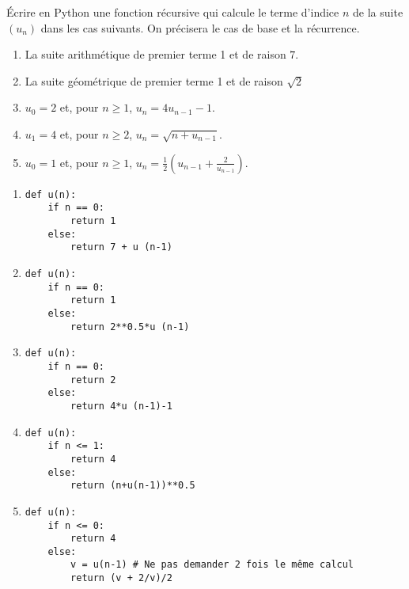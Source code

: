 \begin{Exercise}[title = {Suites}]
Écrire en Python une fonction récursive qui calcule le terme d'indice $n$ de la suite $(u_n)$ dans les cas suivants. On précisera le cas de base et la récurrence.
\begin{enumerate}
\item La suite arithmétique  de premier terme 1 et de raison $7$.

\item La suite géométrique de premier terme 1 et de raison $\sqrt{2}$

\item $u_0=2$ et, pour $n\ge  1$, $u_n=4u_{n-1}-1$.

\item $u_{1}=4$ et, pour $n\ge 2$,  $u_{n}=\sqrt{n+u_{n-1}}$.

\item $u_0=1$ et, pour $n\ge  1$, $\displaystyle u_n=\frac12 \left(u_{n-1}+\frac2{u_{n-1}}\right)$.
\end{enumerate}
\end{Exercise}
\begin{Answer}
\begin{enumerate}
\item 
\begin{lstlisting}
def u(n):
    if n == 0:
        return 1
    else:
        return 7 + u (n-1)
\end{lstlisting} 

\item  
\begin{lstlisting}
def u(n):
    if n == 0:
        return 1
    else:
        return 2**0.5*u (n-1)
\end{lstlisting}

\item 
\begin{lstlisting}
def u(n):
    if n == 0:
        return 2
    else:
        return 4*u (n-1)-1
\end{lstlisting}

\item 
\begin{lstlisting}
def u(n):
    if n <= 1:
        return 4
    else:
        return (n+u(n-1))**0.5
\end{lstlisting}

\item 
\begin{lstlisting}
def u(n):
    if n <= 0:
        return 4
    else:
        v = u(n-1) # Ne pas demander 2 fois le même calcul
        return (v + 2/v)/2
\end{lstlisting}
\end{enumerate}
\end{Answer}
